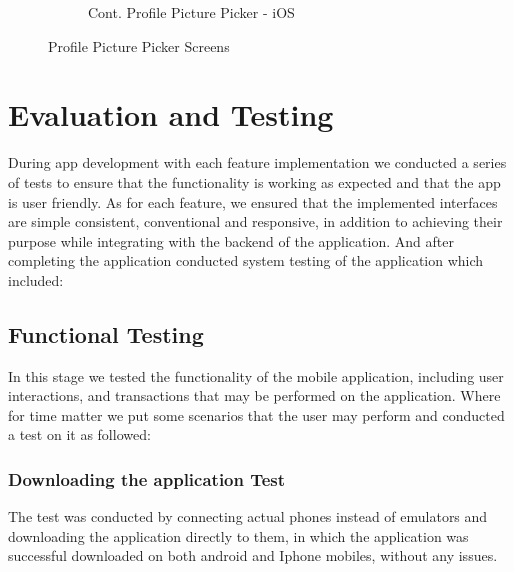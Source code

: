 \documentclass[a4paper, 12pt]{report} %
\begin{document}
\begin{figure}[H]
\begin{subfigure}{0.4\textwidth}
                    \caption{Cont. Profile Picture Picker - iOS}
                    \label{fig:pfp_select_2}
                \end{subfigure}
                \caption{Profile Picture Picker Screens}
                \label{fig:pfp_select}
            \end{figure}

    \pagebreak
    
    \section{Evaluation and Testing}
        During app development with each feature implementation we conducted a series of tests to ensure that the functionality is working as expected and that the app is user friendly. As for each feature, we ensured that the implemented interfaces are simple consistent, conventional and responsive, in addition to achieving their purpose while integrating with the backend of the application.
        And after completing the application conducted system testing of the application which included:
        \subsection{Functional Testing}
            In this stage we tested the functionality of the mobile application, including user interactions, and transactions that may be performed on the application.
            Where for time matter we put some scenarios that the user may perform and conducted a test on it as followed:
            \subsubsection{Downloading the application Test}
                The test was conducted by connecting actual phones instead of emulators and downloading the application directly to them, in which the application was successful downloaded on both android and Iphone mobiles, without any issues.
\end{document}
